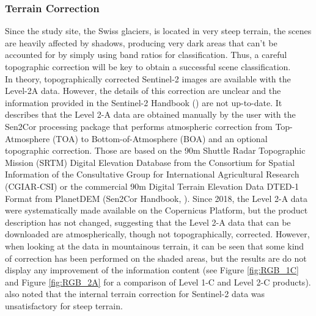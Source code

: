 \documentclass[12pt]{article}
\begin{document}
\subsubsection{Terrain Correction}
\label{Ekstrand}
Since the study site, the Swiss glaciers, is located in very steep terrain, the scenes are heavily affected by shadows, producing very dark areas that can’t be accounted for by simply using band ratios for classification. Thus, a careful topographic correction will be key to obtain a successful scene classification. \\
In theory, topographically corrected Sentinel-2 images are available with the Level-2A data. However, the details of this correction are unclear and the information provided in the Sentinel-2 Handbook (\cite{SentinelHandbook2015}) are not up-to-date. It describes that the Level 2-A data are obtained manually by the user with the Sen2Cor processing package that performs atmospheric correction from Top-Atmosphere (TOA) to Bottom-of-Atmosphere (BOA) and an optional topographic correction. Those are based on the 90m Shuttle Radar Topographic Mission (SRTM) Digital Elevation Database from the Consortium for Spatial Information of the Consultative Group for International Agricultural Research (CGIAR-CSI) or the commercial 90m Digital Terrain Elevation Data DTED-1 Format from PlanetDEM (Sen2Cor Handbook, \cite{Issue2018}). Since 2018, the Level 2-A data were systematically made available on the Copernicus Platform, but the product description has not changed, suggesting that the Level 2-A data that can be downloaded are atmospherically, though not topographically, corrected. However, when looking at the data in mountainous terrain, it can be seen that some kind of correction has been performed on the shaded areas, but the results are do not display any improvement of the information content (see Figure \ref{fig:RGB_1C} and Figure \ref{fig:RGB_2A} for a comparison of Level 1-C and Level 2-C  products). \cite{Paul2016} also noted that the internal terrain correction for Sentinel-2 data was unsatisfactory for steep terrain. \\
\end{document}
